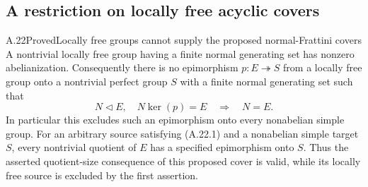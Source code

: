 \subsection{A restriction on locally free acyclic covers}

\begin{claim}{A.22}{Proved}{Locally free groups cannot supply the proposed normal-Frattini covers}
A nontrivial locally free group having a finite normal generating set
has nonzero abelianization. Consequently there is no epimorphism
$p:E\twoheadrightarrow S$ from a locally free group onto a nontrivial
perfect group $S$ with a finite normal generating set such that
\[
 N\triangleleft E,\quad N\ker(p)=E\quad\Longrightarrow\quad N=E.
 \tag{A.22.1}
\]
In particular this excludes such an epimorphism onto every nonabelian
simple group. For an arbitrary source satisfying (A.22.1) and a
nonabelian simple target $S$, every nontrivial quotient of $E$ has a
specified epimorphism onto $S$. Thus the asserted quotient-size
consequence of this proposed cover is valid, while its locally free
source is excluded by the first assertion.
\end{claim}

